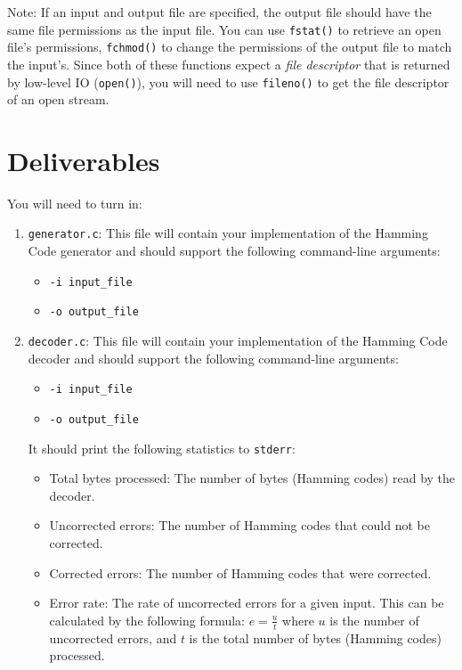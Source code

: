 \documentclass[11pt]{article}
\begin{document}
Note: If an input and output file are specified, the output file should have the same file permissions as
the input file. You can use \texttt{fstat()} to retrieve an open file's permissions, \texttt{fchmod()}
to change the permissions of the output file to match the input's. Since both of these functions
expect a \emph{file descriptor} that is returned by low-level IO (\texttt{open()}), you will need
to use \texttt{fileno()} to get the file descriptor of an open stream.
\section{Deliverables}

\noindent You will need to turn in:
\begin{enumerate}
  \item \texttt{generator.c}: This file will contain your implementation of the
    Hamming Code generator and should support the following command-line arguments:
    \begin{itemize}
        \item \texttt{-i input\_file}
        \item \texttt{-o output\_file}
    \end{itemize}

  \item \texttt{decoder.c}: This file will contain your implementation of the
    Hamming Code decoder and should support the following command-line arguments:
    \begin{itemize}
        \item \texttt{-i input\_file}
        \item \texttt{-o output\_file}
    \end{itemize}
    It should print the following statistics to \texttt{stderr}:
    \begin{itemize}
        \item Total bytes processed: The number of bytes (Hamming codes) read by the decoder. 
        \item Uncorrected errors: The number of Hamming codes that could not be corrected.
        \item Corrected errors: The number of Hamming codes that were corrected.
        \item Error rate: The rate of uncorrected errors for a given input. This can be calculated
        by the following formula: $e = \frac{u}{t}$ where $u$ is the number of uncorrected errors, and
        $t$ is the total number of bytes (Hamming codes) processed. 
    \end{itemize}
    

\end{enumerate}
\end{document}
